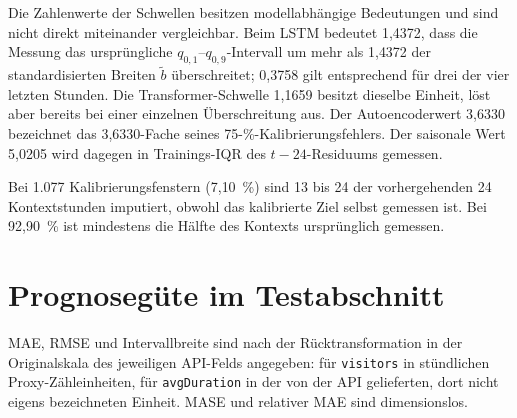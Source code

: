 Die Zahlenwerte der Schwellen besitzen modellabhängige Bedeutungen und sind
nicht direkt miteinander vergleichbar. Beim LSTM bedeutet 1{,}4372, dass die
Messung das ursprüngliche $q_{0{,}1}$--$q_{0{,}9}$-Intervall um mehr als
1{,}4372 der standardisierten Breiten $\widetilde b$ überschreitet; 0{,}3758
gilt entsprechend für drei der vier letzten Stunden.
Die Transformer-Schwelle 1{,}1659 besitzt dieselbe Einheit, löst aber bereits
bei einer einzelnen Überschreitung aus.
Der Autoencoderwert 3{,}6330 bezeichnet das 3{,}6330-Fache seines
75-\%-Kalibrierungsfehlers. Der saisonale Wert 5{,}0205 wird dagegen in
Trainings-IQR des $t-24$-Residuums gemessen.

Bei 1.077 Kalibrierungsfenstern (7{,}10~\%) sind 13 bis 24 der vorhergehenden
24 Kontextstunden imputiert, obwohl das kalibrierte Ziel selbst gemessen ist.
Bei 92{,}90~\% ist mindestens die Hälfte des Kontexts ursprünglich gemessen.

\section{Prognosegüte im Testabschnitt}

\begin{table}[htb]
  \centering
  \small
  \caption{Prognosegüte auf 13.142 gemessenen Testzielen. Die Abdeckung und
    Breite beziehen sich auf die empirisch kalibrierten Intervalle. Eigene
    Darstellung.}
  \label{tab:forecaster_forecast_results}
\end{table}
\FloatBarrier

MAE, RMSE und Intervallbreite sind nach der Rücktransformation in der
Originalskala des jeweiligen API-Felds angegeben: für \texttt{visitors} in
stündlichen Proxy-Zähleinheiten, für \texttt{avgDuration} in der von der API
gelieferten, dort nicht eigens bezeichneten Einheit. MASE und relativer MAE
sind dimensionslos.

